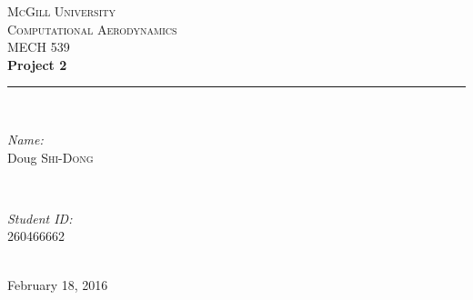 \begin{titlepage}

\newcommand{\HRule}{\rule{\linewidth}{0.5mm}} %

\center %
 


\textsc{\LARGE McGill University}\\[3.5cm]
\textsc{\Large Computational Aerodynamics}\\[0.5cm] 
\textsc{\large MECH 539}\\[2.5cm]


{ \huge \bfseries Project 2}\\[1.5cm] %

\HRule \\[0.4cm]

\begin{minipage}{0.4\textwidth}
\begin{flushleft} \large
\emph{Name:}\\
Doug \textsc{Shi-Dong} %
\end{flushleft}
\end{minipage}
~
\begin{minipage}{0.4\textwidth}
\begin{flushright} \large
\emph{Student ID:} \\
260466662\\
\end{flushright}
\end{minipage}\\[4cm]

\vfill{}
{\large February 18, 2016}\\[2cm]

\end{titlepage}
